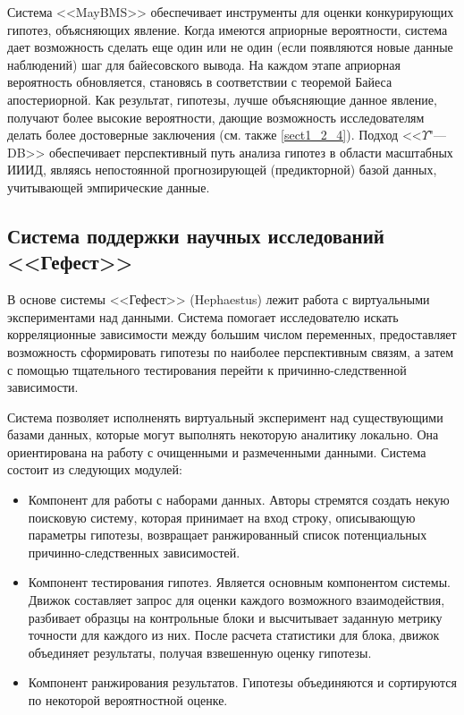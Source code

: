 Система <<MayBMS>> обеспечивает инструменты для оценки конкурирующих гипотез, объясняющих явление. Когда имеются 
априорные вероятности, система дает возможность сделать еще один или не один (если появляются новые данные наблюдений) 
шаг для байесовского вывода. На каждом этапе априорная вероятность обновляется, становясь в соответствии с теоремой 
Байеса апостериорной. Как результат, гипотезы, лучше объясняющие данное явление, получают более высокие вероятности, 
дающие возможность исследователям делать более достоверные заключения (см. также \cref{sect1_2_4}). 
Подход <<$\Upsilon$"---DB>> обеспечивает перспективный путь анализа гипотез в области масштабных ИИИД, являясь 
непостоянной прогнозирующей (предикторной) базой данных, учитывающей эмпирические данные.


\subsection{Система поддержки научных исследований <<Гефест>>}\label{sect1_3_3}
В основе системы <<Гефест>> (Hephaestus) \cite{Duggan2015} лежит работа с виртуальными экспериментами над данными. 
Система помогает исследователю искать корреляционные зависимости между большим числом переменных, предоставляет 
возможность сформировать гипотезы по наиболее перспективным связям, а затем с помощью тщательного тестирования перейти 
к причинно-следственной зависимости. 

Система позволяет исполненять виртуальный эксперимент над существующими базами данных, которые могут выполнять 
некоторую аналитику локально. Она ориентирована на работу с очищенными и размеченными данными. Система состоит из 
следующих модулей:
\begin{itemize}
    \item Компонент для работы с наборами данных. Авторы стремятся создать некую поисковую систему, которая принимает 
            на вход строку, описывающую параметры гипотезы, возвращает ранжированный список потенциальных 
            причинно-следственных зависимостей.
    \item Компонент тестирования гипотез. Является основным компонентом системы. Движок составляет запрос для оценки 
            каждого возможного взаимодействия, разбивает образцы на контрольные блоки и высчитывает заданную метрику 
            точности для каждого из них. После расчета статистики для блока, движок объединяет результаты, получая 
            взвешенную оценку гипотезы.
    \item Компонент ранжирования результатов. Гипотезы объединяются и сортируются по некоторой вероятностной оценке.
\end{itemize}

